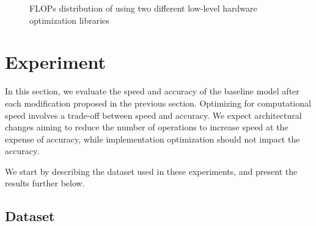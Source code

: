 \documentclass[runningheads]{llncs}
\begin{document}
\begin{figure}[h]
\centering
{}%
%

\centering
\caption{FLOPs distribution of using two different low-level hardware optimization libraries}
\end{figure}


\section{Experiment}



In this section, we evaluate the speed and accuracy of the baseline model after each modification proposed in the previous section.
Optimizing for computational speed involves a trade-off between speed and accuracy.
We expect architectural changes aiming to reduce the number of operations to increase speed at the expense of accuracy,
while implementation optimization should not impact the accuracy.


We start by describing the dataset used in these experiments, and present the results further below.

\subsection{Dataset}
\end{document}
